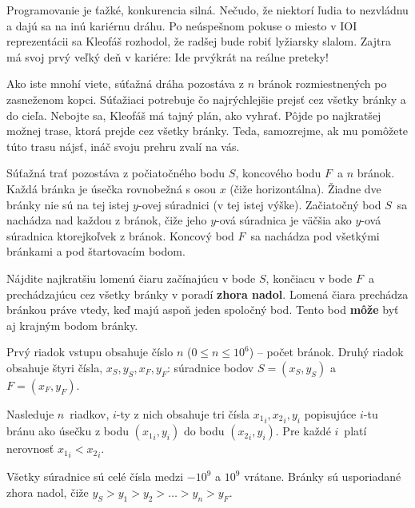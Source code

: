 
\usepackage[slovak]{babel}





Programovanie je ťažké, konkurencia silná. Nečudo, že niektorí ľudia to nezvládnu
a dajú sa na inú kariérnu dráhu. Po neúspešnom pokuse o miesto v IOI reprezentácii
sa Kleofáš rozhodol, že radšej bude robiť lyžiarsky slalom. Zajtra má svoj prvý
veľký deň v kariére: Ide prvýkrát na reálne preteky!

Ako iste mnohí viete, súťažná dráha pozostáva z $n$ bránok rozmiestnených po
zasneženom kopci. Súťažiaci potrebuje čo najrýchlejšie prejsť cez všetky bránky a do cieľa.
Nebojte sa, Kleofáš má tajný plán, ako vyhrať. Pôjde po najkratšej možnej trase,
ktorá prejde cez všetky bránky. Teda, samozrejme, ak mu pomôžete túto trasu nájsť,
ináč svoju prehru zvalí na vás.


Súťažná trať pozostáva z počiatočného bodu $S$, koncového bodu $F$ a $n$ bránok.
Každá bránka je úsečka rovnobežná s osou $x$ (čiže horizontálna). Žiadne dve bránky
nie sú na tej istej $y$-ovej súradnici (v tej istej výške). Začiatočný bod $S$ sa
nachádza nad každou z bránok, čiže jeho $y$-ová súradnica je väčšia ako $y$-ová
súradnica ktorejkoľvek z bránok. Koncový bod $F$ sa nachádza pod všetkými bránkami a 
pod štartovacím bodom.

Nájdite najkratšiu lomenú čiaru začínajúcu v bode $S$, končiacu v bode $F$ a prechádzajúcu
cez všetky bránky v poradí \textbf{zhora nadol}. Lomená čiara prechádza bránkou práve vtedy,
keď majú aspoň jeden spoločný bod. Tento bod \textbf{môže} byť aj krajným bodom bránky.


Prvý riadok vstupu obsahuje číslo $n$ ($0 \leq n \leq 10^6$) -- počet bránok.
Druhý riadok obsahuje štyri čísla, $x_S, y_S, x_F, y_F$: súradnice bodov $S = (x_S, y_S)$
a $F = (x_F, y_F)$.

Nasleduje $n$ riadkov, $i$-ty z nich obsahuje tri čísla ${x_1}_i, {x_2}_i, {y}_i$ popisujúce $i$-tu
bránu ako úsečku z bodu $({x_1}_i, y_i)$ do bodu $({x_2}_i, y_i)$. Pre každé $i$ platí nerovnosť
${x_1}_i < {x_2}_i$.

Všetky súradnice sú celé čísla medzi $-10^9$ a $10^9$ vrátane. Bránky sú usporiadané zhora
nadol, čiže $y_S > y_1 > y_2 > \dots > y_n > y_F$.

